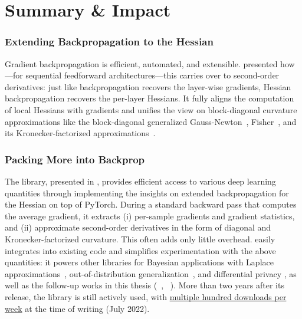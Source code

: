 \section{Summary \& Impact}

\subsubsection{Extending Backpropagation to the Hessian}

Gradient backpropagation is efficient, automated, and extensible.
 presented how---for sequential feedforward architectures---this
carries over to second-order derivatives: just like backpropagation recovers the
layer-wise gradients, Hessian backpropagation recovers the per-layer Hessians.
It fully aligns the computation of local Hessians with gradients and unifies the
view on block-diagonal curvature approximations like the block-diagonal
generalized Gauss-Newton~\cite{schraudolph2002fast},
Fisher~\cite{amari1998natural}, and its Kronecker-factorized
approximations~\cite{martens2015optimizing,grosse2016kronecker,botev2017practical,wei2018bdapch}.

\subsubsection{Packing More into Backprop}

The \backpack library, presented in , provides efficient
access to various deep learning quantities through implementing the insights on
extended backpropagation for the Hessian on top of PyTorch. During a standard
backward pass that computes the average gradient, it extracts (i) per-sample
gradients and gradient statistics, and (ii) approximate second-order derivatives
in the form of diagonal and Kronecker-factorized curvature. This often adds only
little overhead. \backpack easily integrates into existing code and simplifies
experimentation with the above quantities: it powers other libraries for
Bayesian applications with Laplace
approximations~\cite{daxberger2021laplace,immer2021improving},
out-of-distribution generalization~\cite{gulrajani2021in,rame2022fishr}, and
differential privacy \cite{yousefpour2021opacus}, as well as the follow-up works
in this thesis (\cockpit~\cite{schneider2021cockpit},
\vivit~\cite{dangel2022vivit}). More than two years after its release, the
library is still actively used, with
\href{https://pypistats.org/packages/backpack-for-pytorch}{multiple hundred
  downloads per week} at the time of writing (July 2022).

